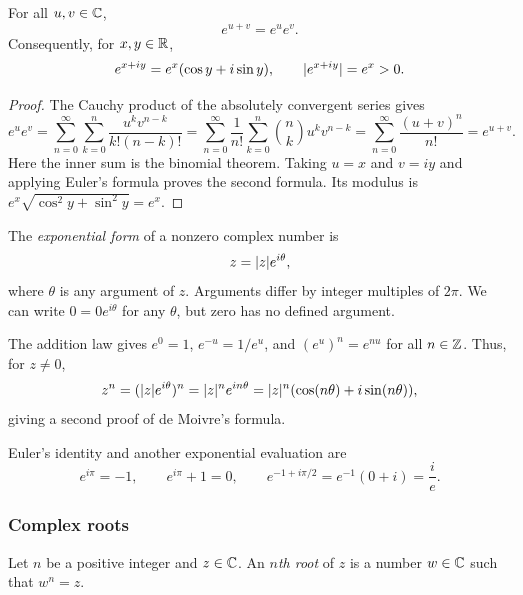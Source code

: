 \documentclass[11pt,a4paper]{amsart}
\begin{document}
\begin{proposition}
  For all \(u,v\in\mathbb{C}\),
  \[
    e^{u+v}=e^ue^v.
  \]
  Consequently, for \(x,y\in\mathbb{R}\),
  \[
    e^{x+iy}=e^x(\cos y+i\sin y),\qquad \lvert e^{x+iy}\rvert=e^x>0.
  \]
\end{proposition}

\begin{proof}
  The Cauchy product of the absolutely convergent series gives
  \[
    e^ue^v
    =\sum_{n=0}^{\infty}\sum_{k=0}^{n}
    \frac{u^kv^{n-k}}{k!(n-k)!}
    =\sum_{n=0}^{\infty}\frac1{n!}
    \sum_{k=0}^{n}\binom nk u^kv^{n-k}
    =\sum_{n=0}^{\infty}\frac{(u+v)^n}{n!}=e^{u+v}.
  \]
  Here the inner sum is the binomial theorem. Taking \(u=x\) and
  \(v=iy\) and applying Euler's formula proves the second formula.
  Its modulus is \(e^x\sqrt{\cos^2y+\sin^2y}=e^x\).
\end{proof}

\begin{definition}
  The \emph{exponential form} of a nonzero complex number is
  \[
    z=\lvert z\rvert e^{i\theta},
  \]
  where \(\theta\) is any argument of \(z\). Arguments differ by
  integer multiples of \(2\pi\). We can write \(0=0e^{i\theta}\)
  for any \(\theta\), but zero has no defined argument.
\end{definition}

\begin{remark}
  The addition law gives \(e^0=1\), \(e^{-u}=1/e^u\), and
  \((e^u)^n=e^{nu}\) for all \(n\in\mathbb{Z}\). Thus, for \(z\neq0\),
  \[
    z^n=(\lvert z\rvert e^{i\theta})^n
    =\lvert z\rvert^ne^{in\theta}
    =\lvert z\rvert^n(\cos(n\theta)+i\sin(n\theta)),
  \]
  giving a second proof of de Moivre's formula.
\end{remark}

\begin{example}
  Euler's identity and another exponential evaluation are
  \[
    e^{i\pi}=-1,\qquad e^{i\pi}+1=0,
    \qquad e^{-1+i\pi/2}=e^{-1}(0+i)=\frac{i}{e}.
  \]
\end{example}

\subsubsection{Complex roots}

\begin{definition}
  Let \(n\) be a positive integer and \(z\in\mathbb{C}\).
  An \emph{\(n\)th root} of \(z\) is a number \(w\in\mathbb{C}\)
  such that \(w^n=z\).
\end{definition}
\end{document}
